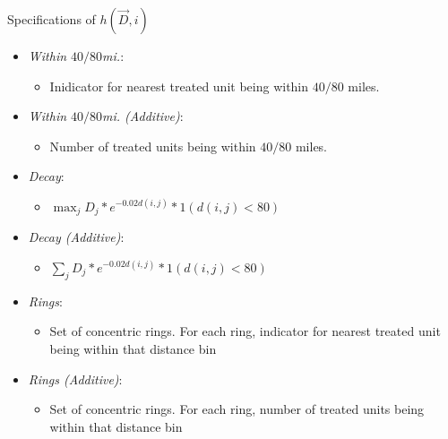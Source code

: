 \documentclass[aspectratio=169]{beamer}
\begin{document}
\begin{frame}{Specifications of $h(\vec{D}, i)$}
    
    \begin{itemize}
        \item \textit{Within $40/80$mi.}:
        \begin{itemize}
            \item Inidicator for nearest treated unit being within $40/80$ miles.
        \end{itemize}
        
        \item \textit{Within $40/80$mi. (Additive)}: 
        \begin{itemize}
            \item Number of treated units being within $40/80$ miles.
        \end{itemize}
        
        \item \textit{Decay}: 
        \begin{itemize}
            \item $\max_j D_j * e^{-0.02 d(i,j)} * 1(d(i,j) < 80)$
        \end{itemize}
        
        \item \textit{Decay (Additive)}: 
        \begin{itemize}
            \item $\sum_j D_j * e^{-0.02 d(i,j)} * 1(d(i,j) < 80)$
        \end{itemize}
        
        \item \textit{Rings}: 
        \begin{itemize}
            \item Set of concentric rings. For each ring, indicator for nearest treated unit being within that distance bin
        \end{itemize}
        
        \item \textit{Rings (Additive)}: 
        \begin{itemize}
            \item Set of concentric rings. For each ring, number of treated units being within that distance bin
        \end{itemize}
    \end{itemize}

\end{frame}
\end{document}
